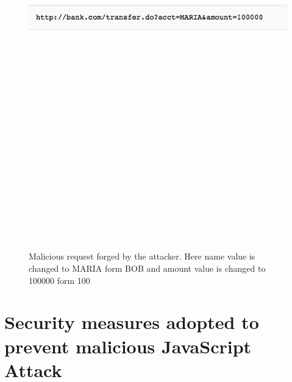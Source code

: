 \begin{figure}[htb]
\centering
\includegraphics[width=16cm,height=20cm,keepaspectratio]{image/csrf2.png}
\caption[Malicious request forged by the attacker]{Malicious request forged by the attacker. Here name value is changed to MARIA form BOB and amount value is changed to 100000 form 100} 
\label{fig:csrf2}
\end{figure}

\section{Security measures adopted to prevent malicious JavaScript Attack}

